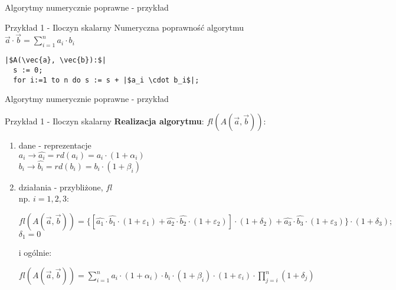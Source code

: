 \begin{frame}[fragile]{Algorytmy numerycznie poprawne - przykład}
	\begin{exampleblock}{Przykład 1 - Iloczyn skalarny}
		Numeryczna poprawność algorytmu $\vec{a} \cdot \vec{b} = \sum_{i=1}^{n} a_i \cdot b_i$
        
\begin{lstlisting}[escapechar=|]
  |$A(\vec{a}, \vec{b}):$|
  s := 0;
  for i:=1 to n do s := s + |$a_i \cdot b_i$|;
\end{lstlisting}
	\end{exampleblock}
\end{frame}
\begin{frame}{Algorytmy numerycznie poprawne - przykład}
	\begin{exampleblock}{Przykład 1 - Iloczyn skalarny }
		{\bf Realizacja algorytmu}: $fl(A(\vec{a}, \vec{b}))$:
        \begin{enumerate}
        	\item dane - reprezentacje \\
                \hspace{1cm} $a_i \to \hat{a_i} = rd(a_i) = a_i \cdot (1 + \alpha_i)$ \\
                \hspace{1cm} $b_i \to \hat{b_i} = rd(b_i) = b_i \cdot (1 + \beta_i)$
        	\item działania - przybliżone, $fl$ \\
            	np. $i = 1, 2, 3:$ \\ 
                \begin{addmargin}[1em]{0em}
                $
                    fl(A(\vec{a}, \vec{b})) = \{
                        [
                            \hat{a_1} \cdot \hat{b_1} \cdot (1 + \varepsilon_1) +
                            \hat{a_2} \cdot \hat{b_2} \cdot (1 + \varepsilon_2)  
                        ]
                        \cdot (1 + \delta_2) + \hat{a_3} \cdot \hat{b_3} \cdot (1 + \varepsilon_3)
                    \} \cdot (1 + \delta_3); 
                $ \\
                $\delta_1 = 0$ \\
                
                \end{addmargin}
            	i ogólnie:
                \begin{addmargin}[1em]{0em}
                $
                	fl(A(\vec{a}, \vec{b})) =
                	\sum_{i=1}^{n} a_i \cdot (1+\alpha_i) \cdot 
                    b_i \cdot (1 + \beta_i) \cdot (1 + \varepsilon_i)
                    \cdot \prod_{j=i}^{n} (1 + \delta_j)
                $                
                \end{addmargin}
        \end{enumerate}
	\end{exampleblock}
\end{frame}
